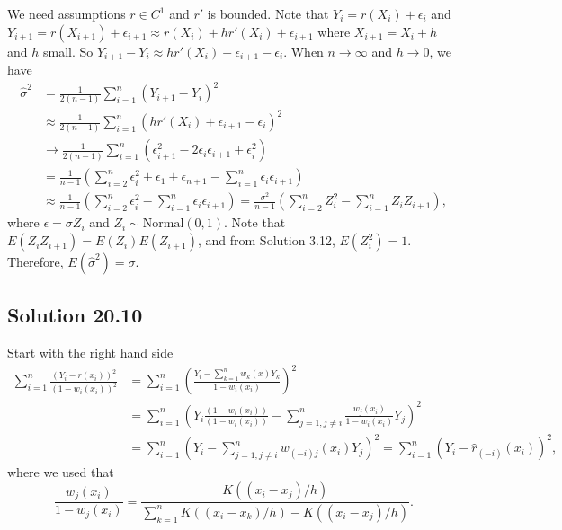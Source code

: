 We need assumptions $r \in C^1$ and $r'$ is bounded.
Note that $Y_i = r(X_i) + \epsilon_i$ and $Y_{i + 1} = r(X_{i + 1}) + \epsilon_{i+1} \approx r(X_i) + hr'(X_i) + \epsilon_{i + 1}$ where $X_{i + 1} = X_i + h$ and $h$ small.
So $Y_{i + 1} - Y_i \approx hr'(X_i) + \epsilon_{i + 1} - \epsilon_i$.
When $n \to \infty$ and $h \to 0$, we have
\begin{equation*}
    \begin{split}
        \hat{\sigma}^2 &= \frac{1}{2(n - 1)} \sum_{i = 1}^n (Y_{i + 1} - Y_i)^2 \\
            &\approx \frac{1}{2(n - 1)} \sum_{i = 1}^n (hr'(X_i) + \epsilon_{i + 1} - \epsilon_i)^2 \\
            &\to \frac{1}{2(n - 1)} \sum_{i = 1}^n (\epsilon_{i + 1}^2 - 2 \epsilon_i \epsilon_{i + 1} + \epsilon_i^2) \\
            &= \frac{1}{n - 1} \left(\sum_{i = 2}^n \epsilon_i^2 + \epsilon_1 + \epsilon_{n + 1} - \sum_{i = 1}^n \epsilon_i \epsilon_{i + 1}\right) \\
            &\approx \frac{1}{n - 1} \left(\sum_{i = 2}^n \epsilon_i^2 - \sum_{i = 1}^n \epsilon_i \epsilon_{i + 1}\right)
            = \frac{\sigma^2}{n - 1} \left(\sum_{i = 2}^n Z_i^2 - \sum_{i = 1}^n Z_i Z_{i + 1}\right),
    \end{split}
\end{equation*}
where $\epsilon = \sigma Z_i$ and $Z_i \sim \mathrm{Normal}(0, 1)$.
Note that $E(Z_i Z_{i + 1}) = E(Z_i) E(Z_{i + 1})$, and from Solution 3.12, $E(Z_i^2) = 1$.
Therefore, $E(\hat{\sigma}^2) = \sigma$.


\subsection*{Solution 20.10}

Start with the right hand side
\begin{equation*}
    \begin{split}
        \sum_{i = 1}^n \frac{(Y_i - r(x_i))^2}{(1 - w_i(x_i))^2}
            &= \sum_{i = 1}^n \left( \frac{Y_i - \sum_{k = 1}^n w_k(x) Y_k}{1 - w_i(x_i)} \right)^2 \\
            &= \sum_{i = 1}^n \left(Y_i \frac{(1 - w_i(x_i))}{(1 - w_i(x_i))} - \sum_{j = 1, j \neq i}^n \frac{w_j(x_i)}{1 - w_i(x_i)} Y_j\right)^2 \\
            &= \sum_{i = 1}^n \left(Y_i - \sum_{j = 1, j \neq i}^n w_{(-i)j}(x_i) Y_j\right)^2
            = \sum_{i = 1}^n \left(Y_i - \hat{r}_{(-i)}(x_i)\right)^2,
    \end{split}
\end{equation*}
where we used that
\begin{equation*}
    \frac{w_j(x_i)}{1 - w_j(x_i)}
        = \frac{K((x_i - x_j)/h)}{\sum_{k = 1}^n K((x_i - x_k)/h) - K((x_i - x_j)/h)}.
\end{equation*}
